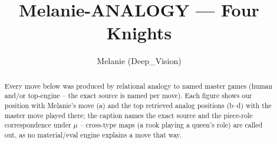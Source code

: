 \documentclass[11pt]{article}
\title{Melanie-ANALOGY — Four Knights}
\author{Melanie (Deep\_Vision)}
\date{}
\begin{document}
\maketitle

\begin{abstract}Every move below was produced by relational analogy to named master games (human and/or top-engine -- the exact source is named per move). Each figure shows our position with Melanie's move (a) and the top retrieved analog positions (b--d) with the master move played there; the caption names the exact source and the piece-role correspondence under $\mu$ -- cross-type maps (a rook playing a queen's role) are called out, as no material/eval engine explains a move that way.\end{abstract}

\begin{figure}[p]\centering
\begin{subfigure}{0.46\textwidth}\centering
\resizebox{\linewidth}{!}{%
\newchessgame
\chessboard[
  setfen={r1bq1rk1/ppp2ppp/2np1n2/1B2p3/1b2P3/2NP1N2/PPP2PPP/R1BQ1RK1 w - - 0 7},
  showmover=false,
  pgfstyle=straightmove, color=movearrow, markmove={b5-c6}
]}
\caption{}
\end{subfigure}\hfill
\begin{subfigure}{0.46\textwidth}\centering
\resizebox{\linewidth}{!}{%
\newchessgame
\chessboard[
  setfen={r1bq1rk1/pppp1ppp/2n2n2/1B2p3/1b2P3/2N2N2/PPPP1PPP/R1BQ1RK1 w - - 8 6},
  showmover=false,
  pgfstyle=straightmove, color=movearrow, markmove={b5-c6}
]}
\caption{}
\end{subfigure}
\\[4pt]
\begin{subfigure}{0.46\textwidth}\centering
\resizebox{\linewidth}{!}{%
\newchessgame
\chessboard[
  setfen={r1bq1rk1/pppp1ppp/2n2n2/1B2p3/1b2P3/2N2N2/PPPP1PPP/R1BQ1RK1 w - - 8 6},
  showmover=false,
  pgfstyle=straightmove, color=movearrow, markmove={b5-c6}
]}
\caption{}
\end{subfigure}\hfill
\begin{subfigure}{0.46\textwidth}\centering
\resizebox{\linewidth}{!}{%
\newchessgame
\chessboard[
  setfen={r1bq1rk1/pppp1ppp/2n2n2/1B2p3/1b2P3/2N2N2/PPPP1PPP/R1BQ1RK1 w - - 8 6},
  showmover=false,
  pgfstyle=straightmove, color=movearrow, markmove={b5-c6}
]}
\caption{}
\end{subfigure}

\end{figure}
\end{document}
